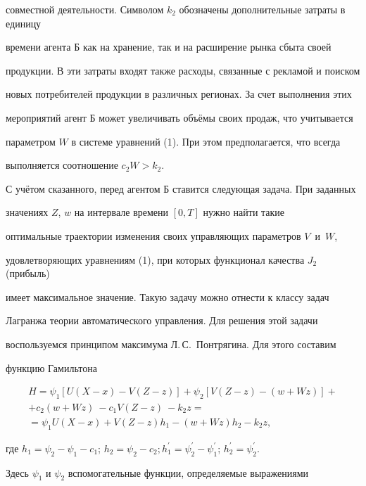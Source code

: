 совместной деятельности. Символом $k_2$ обозначены дополнительные затраты в единицу

времени агента Б как на хранение, так и на расширение рынка сбыта своей

продукции. В эти затраты входят также расходы, связанные с рекламой и поиском

новых потребителей продукции в различных регионах. За счет выполнения этих

мероприятий агент Б может увеличивать объёмы своих продаж, что учитывается

параметром $W$ в системе уравнений (1). При этом предполагается, что всегда

выполняется соотношение $c_2W > k_2$.



С учётом сказанного, перед агентом Б ставится следующая задача. При заданных

значениях $Z$, $w$ на интервале времени $[0, T]$ нужно найти такие

оптимальные траектории изменения своих управляющих параметров $V$~и~$W$,

удовлетворяющих уравнениям (1), при которых функционал качества $J_2$ (прибыль)

имеет максимальное значение. Такую задачу можно отнести к классу задач

Лагранжа теории автоматического управления. Для решения этой задачи

воспользуемся принципом максимума Л.\,С.~Понтрягина. Для этого составим

функцию Гамильтона

\begin{multline}

\label{f2}

         H=\psi_1\left[U(X-x)-V(Z-z)\right]+\psi_2\left[V(Z-z)-(w+Wz)\right]+\\

      +c_2(w+Wz)~-c_1V(Z-z)~-k_2z=\\

      =\psi_1U(X-x)+V(Z-z)h_1-(w+Wz)h_2-k_2z,

\end{multline}



\noindent где $h_1=\psi_2-\psi_1-c_1$; $h_2=\psi_2-c_2; h_1^\prime=\psi_2^\prime-\psi_1^\prime$; $h_2^\prime=\psi_2^\prime$.

Здесь $\psi_1$ и $\psi_2$ вспомогательные функции, определяемые выражениями


